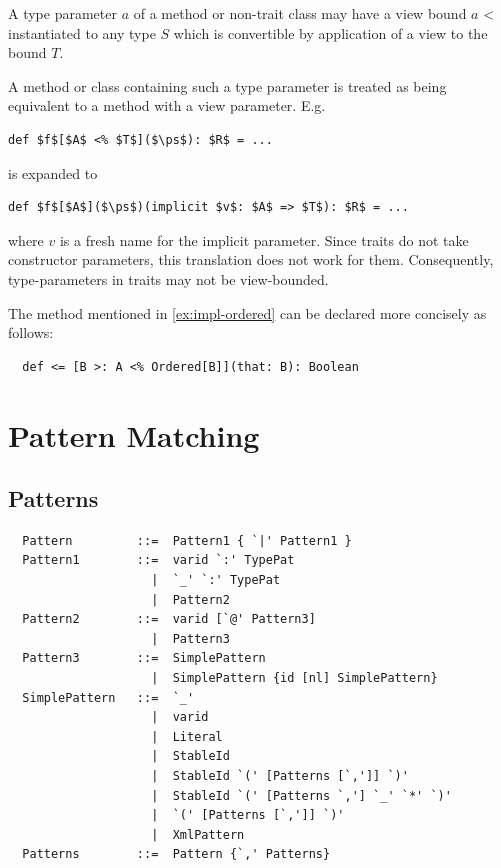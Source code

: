 A type parameter $a$ of a method or non-trait class may have a view bound
\lstinline@$a$ <% $T$@. In this case the type parameter may be
instantiated to any type $S$ which is convertible by application of a
view to the bound $T$.

A method or class containing such a type parameter is treated as being
equivalent to a
method with a view parameter. E.g.
\begin{lstlisting}
def $f$[$A$ <% $T$]($\ps$): $R$ = ...
\end{lstlisting}
is expanded to 
\begin{lstlisting}
def $f$[$A$]($\ps$)(implicit $v$: $A$ => $T$): $R$ = ...
\end{lstlisting}
where $v$ is a fresh name for the implicit parameter.
Since traits do not take constructor parameters, this translation does not work for them.
Consequently, type-parameters in traits may not be view-bounded.

\example The \code{<=} method mentioned in \ref{ex:impl-ordered} can be declared
more concisely as follows:
\begin{lstlisting}
  def <= [B >: A <% Ordered[B]](that: B): Boolean
\end{lstlisting}

\chapter{Pattern Matching}

\section{Patterns}

\label{sec:patterns}

\syntax\begin{lstlisting}
  Pattern         ::=  Pattern1 { `|' Pattern1 }
  Pattern1        ::=  varid `:' TypePat
                    |  `_' `:' TypePat
                    |  Pattern2
  Pattern2        ::=  varid [`@' Pattern3]
                    |  Pattern3
  Pattern3        ::=  SimplePattern 
                    |  SimplePattern {id [nl] SimplePattern}
  SimplePattern   ::=  `_'
                    |  varid
                    |  Literal
                    |  StableId
                    |  StableId `(' [Patterns [`,']] `)'
                    |  StableId `(' [Patterns `,'] `_' `*' `)'
                    |  `(' [Patterns [`,']] `)'
                    |  XmlPattern
  Patterns        ::=  Pattern {`,' Patterns}
\end{lstlisting}

